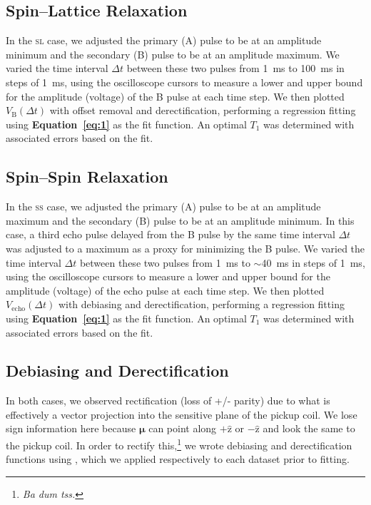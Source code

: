 \documentclass[12pt]{report}
\begin{document}
{    \subsection*{Spin–Lattice Relaxation}
    {
        In the \textsc{sl} case, we adjusted the primary (A) pulse to be at an amplitude minimum and the secondary (B) pulse to be at an amplitude maximum. We varied the time interval $\Delta t$ between these two pulses from \SI{1}{\milli\second} to \SI{100}{\milli\second} in steps of \SI{1}{\milli\second}, using the oscilloscope cursors to measure a lower and upper bound for the amplitude (voltage) of the B pulse at each time step. We then plotted $V_{\mathrm{B}}(\Delta t)$ with offset removal and derectification, performing a regression fitting using \textbf{Equation~\ref{eq:1}} as the fit function. An optimal $T_1$ was determined with associated errors based on the fit.
    }
    \subsection*{Spin–Spin Relaxation}
    {
        In the \textsc{ss} case, we adjusted the primary (A) pulse to be at an amplitude maximum and the secondary (B) pulse to be at an amplitude minimum. In this case, a third echo pulse delayed from the B pulse by the same time interval $\Delta t$ was adjusted to a maximum as a proxy for minimizing the B pulse. We varied the time interval $\Delta t$ between these two pulses from \SI{1}{\milli\second} to $\sim$\SI{40}{\milli\second} in steps of \SI{1}{\milli\second}, using the oscilloscope cursors to measure a lower and upper bound for the amplitude (voltage) of the echo pulse at each time step. We then plotted $V_{\mathrm{echo}}(\Delta t)$ with debiasing and derectification, performing a regression fitting using \textbf{Equation~\ref{eq:1}} as the fit function. An optimal $T_1$ was determined with associated errors based on the fit.
    }

    \subsection*{Debiasing and Derectification}
    {
        In both cases, we observed rectification (loss of +/- parity) due to what is effectively a vector projection into the sensitive plane of the pickup coil. We lose sign information here because $\bm{\mu}$ can point along $+\hat{\mathrm{z}}$ or $-\hat{\mathrm{z}}$ and look the same to the pickup coil. In order to rectify this,\footnote{\textit{Ba dum tss.}} we wrote debiasing and derectification functions using , which we applied respectively to each dataset prior to fitting.
    }
}
\end{document}
